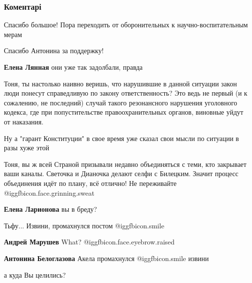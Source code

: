  
 
 
 
 
\subsubsection{Коментарі}

\begin{itemize} %
Спасибо большое! Пора переходить от оборонительных к научно-воспитательным мерам

Спасибо Антонина за поддержку!


\textbf{Елена Лянная} они уже так задолбали, правда


Тоня, ты настолько наивно веришь, что нарушившие в данной ситуации закон люди
понесут справедливую по закону ответственность? Это ведь не первый (и к
сожалению, не последний) случай такого резонансного нарушения уголовного
кодекса, где при попустительстве правоохранительных органов, виновные уйдут от
наказания.

Ну а "гарант Конституции" в свое время уже сказал свои мысли по ситуации в разы
хуже этой


Тоня, вы ж всей Страной призывали недавно объединяться с теми, кто закрывает
ваши каналы. Светочка и Дианочка делают селфи с Билецким. Значит процесс
объединения идёт по плану, всё отлично! Не переживайте  @igg{fbicon.face.grinning.sweat} 

\textbf{Елена Ларионова} вы в бреду?

Тьфу... Извини, промахнулся постом  @igg{fbicon.smile} 


\textbf{Андрей Марушев} What?  @igg{fbicon.face.eyebrow.raised} 

\textbf{Антонина Белоглазова} Акела промахнулся  @igg{fbicon.smile}  извини

а куда Вы целились?



\end{itemize}
